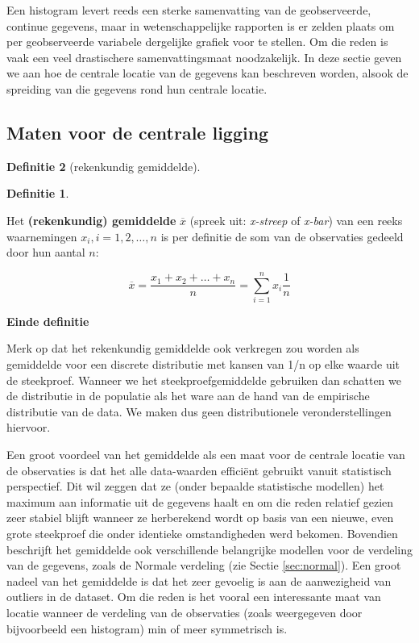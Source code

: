 \documentclass[
  12pt,dutch,coursenotes]{book}
\theoremstyle{definition}
\newtheorem{definition}{Definitie}[chapter]
\theoremstyle{definition}
\theoremstyle{definition}
\theoremstyle{remark}
\begin{document}
Een histogram levert reeds een sterke samenvatting van de geobserveerde,
continue gegevens, maar in wetenschappelijke rapporten is er zelden
plaats om per geobserveerde variabele dergelijke grafiek voor te stellen. Om
die reden is vaak een veel drastischere samenvattingsmaat noodzakelijk. In deze
sectie geven we aan hoe de centrale locatie van de gegevens kan beschreven
worden, alsook de spreiding van die gegevens rond hun centrale locatie.

\hypertarget{maten-voor-de-centrale-ligging}{%
\subsection{Maten voor de centrale ligging}\label{maten-voor-de-centrale-ligging}}

\begin{definition}[rekenkundig gemiddelde]
\begin{definition}

\protect\hypertarget{def:unnamed-chunk-93}{}{\label{def:unnamed-chunk-93} \iffalse (rekenkundig gemiddelde) \fi{} }

\end{definition}
\end{definition}

Het \textbf{(rekenkundig) gemiddelde} \(\overline{x}\) (spreek uit: \emph{x-streep}
of \emph{x-bar}) van een reeks waarnemingen \(x_i, i=1, 2, \dots, n\) is per
definitie de som van de observaties gedeeld door hun aantal \(n\):

\[\overline{x}= \frac{x_1 + x_2 + \dots + x_n}{n} =\sum_{i=1}^n x_i \frac{1}{n} \]

\textbf{Einde definitie}

Merk op dat het rekenkundig gemiddelde ook verkregen zou worden als gemiddelde voor een discrete distributie met kansen van 1/n op elke waarde uit de steekproef.
Wanneer we het steekproefgemiddelde gebruiken dan schatten we de distributie in de populatie als het ware aan de hand van de empirische distributie van de data. We maken dus geen distributionele veronderstellingen hiervoor.

Een groot voordeel van het gemiddelde als een maat voor de centrale locatie
van de observaties is dat het alle data-waarden efficiënt gebruikt vanuit
statistisch perspectief. Dit wil zeggen dat ze (onder bepaalde statistische modellen)
het maximum aan informatie
uit de gegevens haalt en om die reden relatief gezien zeer stabiel blijft
wanneer ze herberekend wordt op basis van een nieuwe, even grote steekproef
die onder identieke omstandigheden werd bekomen. Bovendien beschrijft het
gemiddelde ook verschillende belangrijke modellen voor de verdeling van de
gegevens, zoals de Normale verdeling (zie Sectie \ref{sec:normal}). Een
groot nadeel van het gemiddelde is dat het zeer gevoelig is aan de
aanwezigheid van outliers in de dataset. Om die reden is het vooral een
interessante maat van locatie wanneer de verdeling van de observaties (zoals
weergegeven door bijvoorbeeld een histogram) min of meer symmetrisch is.
\end{document}
